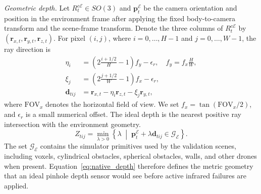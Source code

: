 \documentclass[letterpaper,journal]{IEEEtran}
\begin{document}
\textit{Geometric depth.}
Let $R_{t}^{c\mathcal{E}}\in SO(3)$ and $\mathbf{p}_{t}^{\mathcal{E}}$ be the
camera orientation and position in the environment frame after applying the
fixed body-to-camera transform and the scene-frame transform. Denote the three
columns of $R_{t}^{c\mathcal{E}}$ by
$(\mathbf{r}_{x,t},\mathbf{r}_{y,t},\mathbf{r}_{z,t})$. For pixel
$(i,j)$, where $i=0,\ldots,H-1$ and $j=0,\ldots,W-1$, the ray direction is
\begin{align}
    \eta_i &=
    \left(2\frac{i+1/2}{H}-1\right)f_y-\epsilon_r,\quad
    f_y=f_x\frac{H}{W},\\
    \xi_j &=
    \left(2\frac{j+1/2}{W}-1\right)f_x-\epsilon_r,\\
    \mathbf{d}_{tij}
    &=\mathbf{r}_{x,t}-\eta_i\mathbf{r}_{z,t}-\xi_j\mathbf{r}_{y,t},
    \label{eq:ray_direction}
\end{align}
where $\mathrm{FOV}_x$ denotes the horizontal field of view. We set
$f_x=\tan(\mathrm{FOV}_x/2)$, and $\epsilon_r$ is a small numerical offset.
The ideal depth is the nearest positive ray intersection with the environment
geometry.
\begin{equation}
    Z_{tij}=
    \min_{\lambda>0}
    \left\{\lambda\;\middle|\;
    \mathbf{p}_{t}^{\mathcal{E}}+\lambda\mathbf{d}_{tij}
    \in\mathcal{G}_{\mathcal{E}}\right\}.
    \label{eq:native_depth}
\end{equation}
The set $\mathcal{G}_{\mathcal{E}}$ contains the simulator primitives used by
the validation scenes, including voxels, cylindrical obstacles, spherical
obstacles, walls, and other drones when present. Equation~\eqref{eq:native_depth}
therefore defines the metric geometry that an ideal pinhole depth sensor would
see before active infrared failures are applied.
\end{document}
